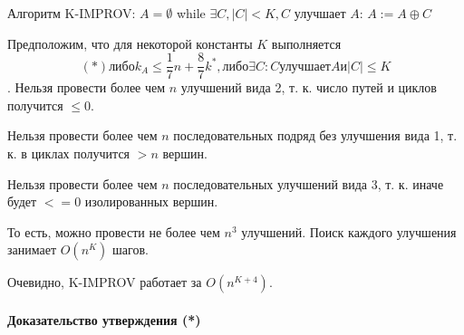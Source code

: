 Алгоритм K-IMPROV:
$A = \emptyset$
while $\exists C, |C|<K, C$ улучшает $A$:
$A := A \oplus C$

Предположим, что для некоторой константы $K$ выполняется 
$$(*) \text{либо} k_A \le \frac{1}{7}n+\frac{8}{7}k^*, \text{либо} \exists C: C \text{улучшает} A \textbf{и} |C|\le K$$.
Нельзя провести более чем $n$ улучшений вида 2, т. к. число путей и циклов получится $\le0$.

Нельзя провести более чем $n$ последовательных подряд без улучшения вида 1, т. к. в циклах получится $>n$ вершин.

Нельзя провести более чем $n$ последовательных улучшений вида 3, т. к. иначе будет $<= 0$ изолированных вершин. 

То есть, можно провести не более чем $n^3$ улучшений. Поиск каждого улучшения занимает $O(n^K)$ шагов.

Очевидно, K-IMPROV работает за $O(n^{K+4})$. 

\paragraph{Доказательство утверждения (*)}

